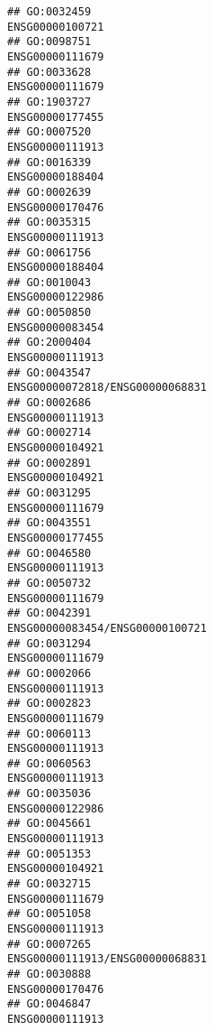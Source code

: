 \documentclass[
]{article}
\begin{document}
\begin{verbatim}
## GO:0032459                                                 ENSG00000100721
## GO:0098751                                                 ENSG00000111679
## GO:0033628                                                 ENSG00000111679
## GO:1903727                                                 ENSG00000177455
## GO:0007520                                                 ENSG00000111913
## GO:0016339                                                 ENSG00000188404
## GO:0002639                                                 ENSG00000170476
## GO:0035315                                                 ENSG00000111913
## GO:0061756                                                 ENSG00000188404
## GO:0010043                                                 ENSG00000122986
## GO:0050850                                                 ENSG00000083454
## GO:2000404                                                 ENSG00000111913
## GO:0043547                                 ENSG00000072818/ENSG00000068831
## GO:0002686                                                 ENSG00000111913
## GO:0002714                                                 ENSG00000104921
## GO:0002891                                                 ENSG00000104921
## GO:0031295                                                 ENSG00000111679
## GO:0043551                                                 ENSG00000177455
## GO:0046580                                                 ENSG00000111913
## GO:0050732                                                 ENSG00000111679
## GO:0042391                                 ENSG00000083454/ENSG00000100721
## GO:0031294                                                 ENSG00000111679
## GO:0002066                                                 ENSG00000111913
## GO:0002823                                                 ENSG00000111679
## GO:0060113                                                 ENSG00000111913
## GO:0060563                                                 ENSG00000111913
## GO:0035036                                                 ENSG00000122986
## GO:0045661                                                 ENSG00000111913
## GO:0051353                                                 ENSG00000104921
## GO:0032715                                                 ENSG00000111679
## GO:0051058                                                 ENSG00000111913
## GO:0007265                                 ENSG00000111913/ENSG00000068831
## GO:0030888                                                 ENSG00000170476
## GO:0046847                                                 ENSG00000111913

\end{verbatim}
\end{document}
